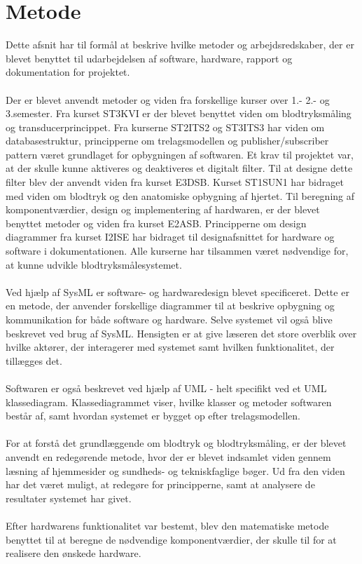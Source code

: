 \section{Metode}
Dette afsnit har til formål at beskrive hvilke metoder og arbejdsredskaber, der er blevet benyttet til udarbejdelsen af software, hardware, rapport og dokumentation for projektet. 
\\\\
Der er blevet anvendt metoder og viden fra forskellige kurser over 1.- 2.- og 3.semester. Fra kurset ST3KVI er der blevet benyttet viden om blodtryksmåling og transducerprincippet. Fra kurserne ST2ITS2 og ST3ITS3 har viden om databasestruktur, principperne om trelagsmodellen og publisher/subscriber pattern været grundlaget for opbygningen af softwaren. Et krav til projektet var, at der skulle kunne aktiveres og deaktiveres et digitalt filter. Til at designe dette filter blev der anvendt viden fra kurset E3DSB. Kurset ST1SUN1 har bidraget med viden om blodtryk og den anatomiske opbygning af hjertet. Til beregning af komponentværdier, design og implementering af hardwaren, er der blevet benyttet metoder og viden fra kurset E2ASB. Principperne om design diagrammer fra kurset I2ISE har bidraget til designafsnittet for hardware og software i dokumentationen. Alle kurserne har tilsammen været nødvendige for, at kunne udvikle blodtryksmålesystemet.
\\\\
Ved hjælp af SysML er software- og hardwaredesign blevet specificeret. Dette er en metode, der anvender forskellige diagrammer til at beskrive opbygning og kommunikation for både software og hardware. Selve systemet vil også blive beskrevet ved brug af SysML. Hensigten er at give læseren det store overblik over hvilke aktører, der interagerer med systemet samt hvilken funktionalitet, der tillægges det. 
\\ \\
Softwaren er også beskrevet ved hjælp af UML - helt specifikt ved et UML klassediagram. Klassediagrammet viser, hvilke klasser og metoder softwaren består af, samt hvordan systemet er bygget op efter trelagsmodellen.
\\\\
For at forstå det grundlæggende om blodtryk og blodtryksmåling, er der blevet anvendt en redegørende metode, hvor der er blevet indsamlet viden gennem læsning af hjemmesider og sundheds- og tekniskfaglige bøger. Ud fra den viden har det været muligt, at redegøre for principperne, samt at analysere de resultater systemet har givet.
\\\\
Efter hardwarens funktionalitet var bestemt, blev den matematiske metode benyttet til at beregne de nødvendige komponentværdier, der skulle til for at realisere den ønskede hardware.

